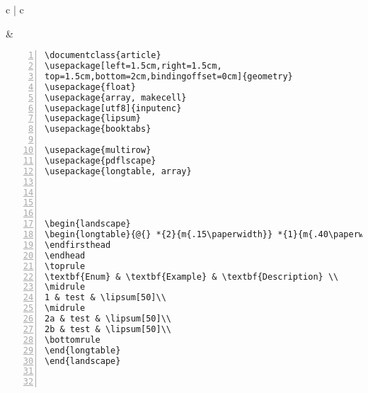 \begin{tabular}{c | c}
\begin{minipage}[m]{0.4\textwidth}
\end{minipage}
&
\begin{minipage}[m]{0.55\textwidth}
\renewcommand\textminus{\mbox{-}}%
\begin{lstlisting}[numberstyle=\zebra{green!15}{yellow!15},numbers=left,basicstyle=\footnotesize] 
\documentclass{article}
\usepackage[left=1.5cm,right=1.5cm,
top=1.5cm,bottom=2cm,bindingoffset=0cm]{geometry}
\usepackage{float}
\usepackage{array, makecell}
\usepackage[utf8]{inputenc}
\usepackage{lipsum}
\usepackage{booktabs}

\usepackage{multirow}
\usepackage{pdflscape}
\usepackage{longtable, array}




\begin{landscape}
\begin{longtable}{@{} *{2}{m{.15\paperwidth}} *{1}{m{.40\paperwidth}} @{}}
\endfirsthead
\endhead
\toprule
\textbf{Enum} & \textbf{Example} & \textbf{Description} \\
\midrule
1 & test & \lipsum[50]\\
\midrule
2a & test & \lipsum[50]\\
2b & test & \lipsum[50]\\
\bottomrule
\end{longtable}
\end{landscape}

          
\end{lstlisting}
\end{minipage}
\end{tabular}













